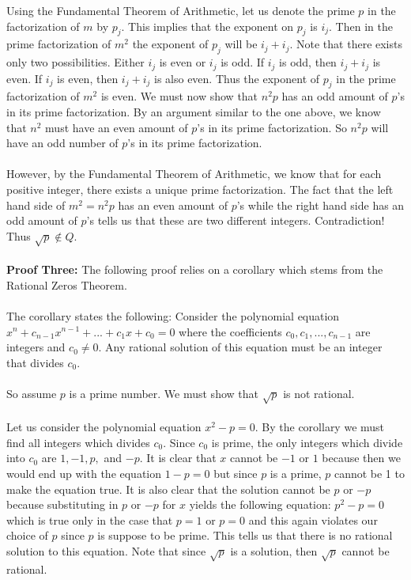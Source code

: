 \documentclass[12pt]{article}
\begin{document}
Using the Fundamental Theorem of Arithmetic, let us denote the prime $p$ in the factorization of $m$ by $p_j$. This implies that the exponent on $p_j$ is $i_j$. Then in the prime factorization of $m^2$ the exponent of $p_j$ will be $i_j + i_j$. Note that there exists only two possibilities. Either $i_j$ is even or $i_j$ is odd.  If $i_j$ is odd, then $i_j + i_j$ is even. If $i_j$ is even, then $i_j + i_j$ is also even. Thus the exponent of  $p_j$ in the prime factorization of $m^2$ is even. We must now show that $n^2 p$ has an odd amount of $p$'s in its prime factorization. By an argument similar to the one above, we know that $n^2$ must have an even amount of $p$'s in its prime factorization. So  $n^2 p$ will have an odd number of $p$'s in its prime factorization. \\ \\
However, by the Fundamental Theorem of Arithmetic, we know that for each positive integer, there exists a unique prime factorization. The fact that the left hand side of $m^2 = n^2 p$ has an even amount of $p$'s while the right hand side has an odd amount of $p$'s tells us that these are two different integers. Contradiction! Thus $\sqrt{p} \not\in Q$.\\ \\
\textbf{Proof Three:} The following proof relies on a corollary which stems from the Rational Zeros Theorem. \\ \\
The corollary states the following: Consider the polynomial equation $x^n + c_{n-1} x^{n-1}+ ... + c_1 x + c_0 = 0$ where the coefficients $c_{0}, c_{1} , ..., c_{n-1}$ are integers and $c_{0} \not= 0.$ Any rational solution of this equation must be an integer that divides $c_{0}.$ \\ \\
So assume $p$ is a prime number. We must show that $\sqrt{p}$  is not rational. \\ \\
 Let us consider the polynomial equation $x^{2} - p = 0$. By the corollary we must find  all integers which divides $c_{0}.$ Since $c_{0}$ is prime, the only integers which divide into $c_{0}$ are $1,-1,p,$ and $-p$. It is clear that $x$ cannot be $-1$ or $1$ because then we would end up with the equation $1-p=0$ but since $p$ is a prime, $p$ cannot be 1 to make the equation true. It is also clear that the solution cannot be $p$ or $-p$ because substituting in $p$ or $-p$ for $x$ yields the following equation: $p^2 - p = 0$ which is true only in the case that $p=1$ or $p=0$ and this again violates our choice of $p$ since $p$ is suppose to be prime. This tells us that there is no rational solution to this equation. Note that since $\sqrt{p}$ is a solution, then $\sqrt{p}$ cannot be rational. \\
\end{document}
